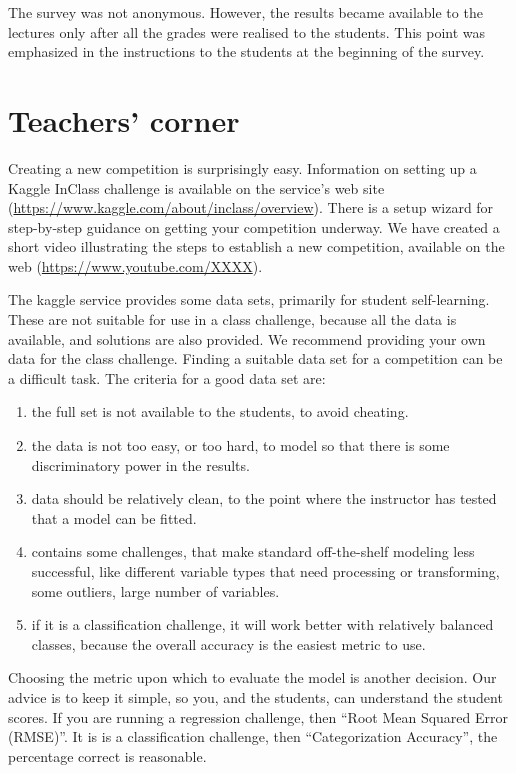 \documentclass[12pt]{article}
\begin{document}
The survey was not anonymous. However, the results became available to
the lectures only after all the grades were realised to the students.
This point was emphasized in the instructions to the students at the
beginning of the survey.

\section{Teachers' corner}\label{teachers-corner}

Creating a new competition is surprisingly easy. Information on setting
up a Kaggle InClass challenge is available on the service's web site
(\url{https://www.kaggle.com/about/inclass/overview}). There is a setup
wizard for step-by-step guidance on getting your competition underway.
We have created a short video illustrating the steps to establish a new
competition, available on the web (\url{https://www.youtube.com/XXXX}).

The kaggle service provides some data sets, primarily for student
self-learning. These are not suitable for use in a class challenge,
because all the data is available, and solutions are also provided. We
recommend providing your own data for the class challenge. Finding a
suitable data set for a competition can be a difficult task. The
criteria for a good data set are:

\begin{enumerate}
\def\labelenumi{\arabic{enumi}.}
\tightlist
\item
  the full set is not available to the students, to avoid cheating.
\item
  the data is not too easy, or too hard, to model so that there is some
  discriminatory power in the results.
\item
  data should be relatively clean, to the point where the instructor has
  tested that a model can be fitted.
\item
  contains some challenges, that make standard off-the-shelf modeling
  less successful, like different variable types that need processing or
  transforming, some outliers, large number of variables.
\item
  if it is a classification challenge, it will work better with
  relatively balanced classes, because the overall accuracy is the
  easiest metric to use.
\end{enumerate}

Choosing the metric upon which to evaluate the model is another
decision. Our advice is to keep it simple, so you, and the students, can
understand the student scores. If you are running a regression
challenge, then ``Root Mean Squared Error (RMSE)''. It is is a
classification challenge, then ``Categorization Accuracy'', the
percentage correct is reasonable.
\end{document}
